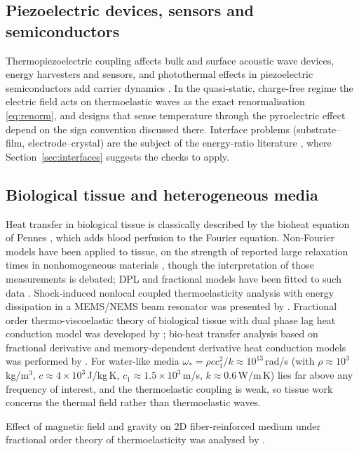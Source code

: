\subsection{Piezoelectric devices, sensors and semiconductors}
Thermopiezoelectric coupling affects bulk and surface acoustic wave devices, energy harvesters and sensors, and photothermal effects in piezoelectric semiconductors add carrier dynamics \citep{Gupta2023,Gupta2024a,Gupta2026HeatMap}. In the quasi-static, charge-free regime the electric field acts on thermoelastic waves as the exact renormalisation \eqref{eq:renorm}, and designs that sense temperature through the pyroelectric effect depend on the sign convention discussed there. Interface problems (substrate--film, electrode--crystal) are the subject of the energy-ratio literature \citep{Barak2023IJP,Barak2023JTS,Gupta2023Energy,Kumar2024,Kumar2024a}, where Section~\ref{sec:interfaces} suggests the checks to apply.

\subsection{Biological tissue and heterogeneous media}
Heat transfer in biological tissue is classically described by the bioheat equation of Pennes \citep{Pennes1948}, which adds blood perfusion to the Fourier equation. Non-Fourier models have been applied to tissue, on the strength of reported large relaxation times in nonhomogeneous materials \citep{Kaminski1990,Mitra1995}, though the interpretation of those measurements is debated; DPL and fractional models have been fitted to such data \citep{vanDerMerwe2021,Yu2024}. Shock-induced nonlocal coupled thermoelasticity analysis with energy dissipation in a MEMS/NEMS beam resonator was presented by \citep{Hosseini2017}. Fractional order thermo-viscoelastic theory of biological tissue with dual phase lag heat conduction model was developed by \citep{Li2021}; bio-heat transfer analysis based on fractional derivative and memory-dependent derivative heat conduction models was performed by \citep{Zhang2021}. For water-like media $\omega_*=\rho cc_1^2/k\approx10^{13}$\,rad/s (with $\rho\approx10^3$\,kg/m$^3$, $c\approx4\times10^3$\,J/kg\,K, $c_1\approx1.5\times10^3$\,m/s, $k\approx0.6$\,W/m\,K) lies far above any frequency of interest, and the thermoelastic coupling is weak, so tissue work concerns the thermal field rather than thermoelastic waves.

Effect of magnetic field and gravity on 2D fiber-reinforced medium under fractional order theory of thermoelasticity was analysed by \citep{Ma2020}.

